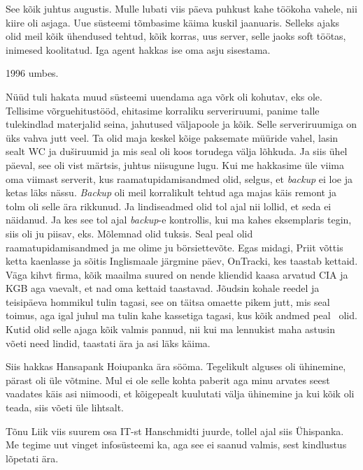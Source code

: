 See kõik juhtus augustis. Mulle lubati viis päeva puhkust kahe töökoha vahele, nii kiire oli asjaga. Uue süsteemi tõmbasime käima kuskil jaanuaris. Selleks ajaks olid meil kõik ühendused tehtud, kõik korras, uus server, selle jaoks soft töötas, inimesed koolitatud. Iga agent hakkas ise oma asju sisestama.


1996 umbes. 

Nüüd tuli hakata muud süsteemi uuendama aga võrk oli kohutav, eks ole. Tellisime võrguehitustööd, ehitasime korraliku serveriruumi, panime talle tulekindlad materjalid seina, jahutused väljapoole ja kõik. Selle serveriruumiga on üks vahva jutt veel. Ta olid maja keskel kõige paksemate müüride vahel, lasin sealt WC ja duširuumid ja mis seal oli koos torudega välja lõhkuda. Ja siis ühel päeval, see oli vist märtsis, juhtus niisugune lugu. Kui me hakkasime üle viima oma  viimast serverit, kus raamatupidamisandmed olid, selgus, et \emph{backup} ei loe ja ketas läks nässu. \emph{Backup} oli meil korralikult tehtud aga majas käis remont ja tolm oli selle ära rikkunud. Ja lindiseadmed olid tol ajal nii lollid, et seda ei näidanud. Ja kes see tol ajal \emph{backup}-e kontrollis, kui ma kahes eksemplaris tegin, siis oli ju piisav, eks. Mõlemnad olid tuksis. Seal peal olid raamatupidamisandmed ja me olime ju börsiettevõte. Egas midagi, Priit võttis  ketta kaenlasse ja sõitis Inglismaale järgmine päev, OnTracki, kes taastab kettaid. Väga kihvt firma, kõik maailma suured on nende kliendid kaasa arvatud CIA ja KGB aga vaevalt, et nad oma kettaid taastavad. Jõudsin kohale reedel ja teisipäeva hommikul tulin tagasi, see on täitsa omaette pikem jutt, mis seal toimus, aga igal juhul ma tulin kahe kassetiga tagasi, kus kõik andmed peal  olid. Kutid olid selle ajaga kõik valmis pannud, nii kui ma lennukist maha astusin võeti need lindid, taastati  ära ja asi läks käima. 

Siis hakkas Hansapank Hoiupanka ära sööma. Tegelikult alguses oli ühinemine, pärast oli üle võtmine. Mul ei ole selle kohta paberit aga minu arvates seest vaadates käis asi niimoodi, et kõigepealt kuulutati välja ühinemine ja kui kõik oli teada, siis võeti üle lihtsalt. 

Tõnu Liik viis suurem osa IT-st Hanschmidti juurde, tollel ajal siis Ühispanka. Me tegime uut vinget infosüsteemi ka, aga see ei saanud valmis, sest kindlustus lõpetati ära. 

